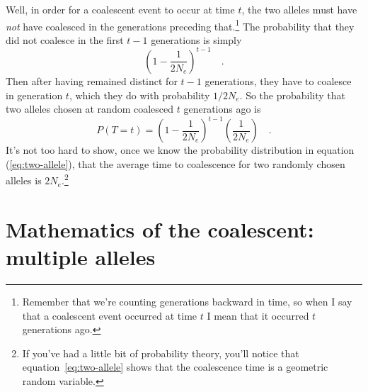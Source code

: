 \documentclass[12pt]{article}
\begin{document}
Well, in order for a coalescent event to occur at time $t$, the two
alleles must have {\it not\/} have coalesced in the generations
preceding that.\footnote{Remember that we're counting generations
  backward in time, so when I say that a coalescent event occurred at
  time $t$ I mean that it occurred $t$ generations ago.} The
probability that they did not coalesce in the first $t-1$ generations
is simply
\[
\left(1 - \frac{1}{2N_e}\right)^{t-1} \quad .
\]
Then after having remained distinct for $t-1$ generations, they have
to coalesce in generation $t$, which they do with probability
$1/2N_e$. So the probability that two alleles chosen at random
coalesced $t$ generations ago is
\begin{equation}
P(T=t) = \left(1 -
\frac{1}{2N_e}\right)^{t-1}\left(\frac{1}{2N_e}\right) \quad .
\label{eq:two-allele}
\end{equation}
It's not too hard to show, once we know the probability distribution
in equation (\ref{eq:two-allele}), that the average time to
coalescence for two randomly chosen alleles is $2N_e$.\footnote{If
  you've had a little bit of probability theory, you'll notice that
  equation~\ref{eq:two-allele} shows that the coalescence time is a
  geometric random variable.}

\section*{Mathematics of the coalescent: multiple
  alleles}
\end{document}
